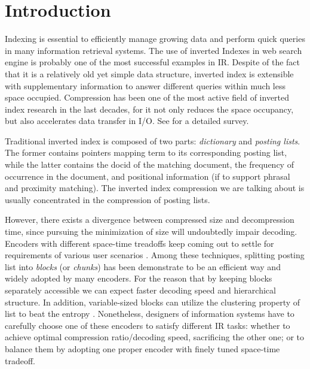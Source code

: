 \documentclass{sig-alternate-05-2015}
\begin{document}


%
%

%
%
\printccsdesc



\section{Introduction}\label{sec:intro}
Indexing is essential to efficiently manage growing data and perform quick queries in many information retrieval systems.
The use of inverted Indexes in web search engine is probably one of the most successful examples in IR.
Despite of the fact that it is a relatively old yet simple data structure, inverted index is extensible with supplementary information to answer different queries within much less space occupied.
Compression has been one of the most active field of inverted index research in the last decades, for it not only reduces the space occupancy, but also accelerates data transfer in I/O.
See \cite{catena2014inverted,trotman2014compression,zobel2006inverted} for a detailed survey.

Traditional inverted index is composed of two parts: \textit{dictionary} and \textit{posting lists}.
The former contains pointers mapping term to its corresponding posting list, while the latter contains the docid of the matching document, the frequency of occurrence in the document, and positional information (if to support phrasal and proximity matching).
The inverted index compression  we are talking about is usually concentrated in the compression of posting lists.

However, there exists a divergence between compressed size and decompression time,
since pursuing the minimization of size will undoubtedly impair decoding.
Encoders with different space-time treadoffs keep coming out to settle for requirements of various user scenarios \cite{lemire2015decoding,ottaviano2015optimal,ottaviano2014partitioned,petri2014score,silvestri2010vsencoding}.
Among these techniques, splitting posting list into \textit{blocks} (or \textit{chunks}) has been demonstrate to be an efficient way and widely adopted by many encoders.
For the reason that by keeping blocks separately accessible we can expect faster decoding speed and hierarchical structure.
In addition, variable-sized blocks can utilize the clustering property of list to beat the entropy \cite{moffat2000binary,silvestri2010vsencoding}.
Nonetheless, designers of information systems have to carefully choose one of these encoders to satisfy different IR tasks: whether to achieve optimal compression ratio/decoding speed, sacrificing the other one; or to balance them by adopting one proper encoder with finely tuned space-time tradeoff.
\end{document}
